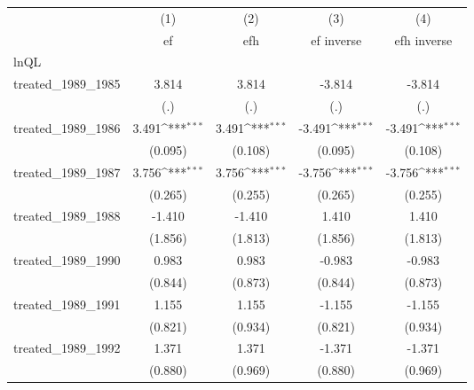 {
\def\sym#1{\ifmmode^{#1}\else\(^{#1}\)\fi}
\begin{tabular}{l*{4}{c}}
\hline\hline
            &\multicolumn{1}{c}{(1)}&\multicolumn{1}{c}{(2)}&\multicolumn{1}{c}{(3)}&\multicolumn{1}{c}{(4)}\\
            &\multicolumn{1}{c}{ef}&\multicolumn{1}{c}{efh}&\multicolumn{1}{c}{ef inverse}&\multicolumn{1}{c}{efh inverse}\\
\hline
lnQL        &                     &                     &                     &                     \\
treated\_1989\_1985&       3.814         &       3.814         &      -3.814         &      -3.814         \\
            &         (.)         &         (.)         &         (.)         &         (.)         \\
[1em]
treated\_1989\_1986&       3.491\sym{***}&       3.491\sym{***}&      -3.491\sym{***}&      -3.491\sym{***}\\
            &     (0.095)         &     (0.108)         &     (0.095)         &     (0.108)         \\
[1em]
treated\_1989\_1987&       3.756\sym{***}&       3.756\sym{***}&      -3.756\sym{***}&      -3.756\sym{***}\\
            &     (0.265)         &     (0.255)         &     (0.265)         &     (0.255)         \\
[1em]
treated\_1989\_1988&      -1.410         &      -1.410         &       1.410         &       1.410         \\
            &     (1.856)         &     (1.813)         &     (1.856)         &     (1.813)         \\
[1em]
treated\_1989\_1990&       0.983         &       0.983         &      -0.983         &      -0.983         \\
            &     (0.844)         &     (0.873)         &     (0.844)         &     (0.873)         \\
[1em]
treated\_1989\_1991&       1.155         &       1.155         &      -1.155         &      -1.155         \\
            &     (0.821)         &     (0.934)         &     (0.821)         &     (0.934)         \\
[1em]
treated\_1989\_1992&       1.371         &       1.371         &      -1.371         &      -1.371         \\
            &     (0.880)         &     (0.969)         &     (0.880)         &     (0.969)         \\

\end{tabular}}
